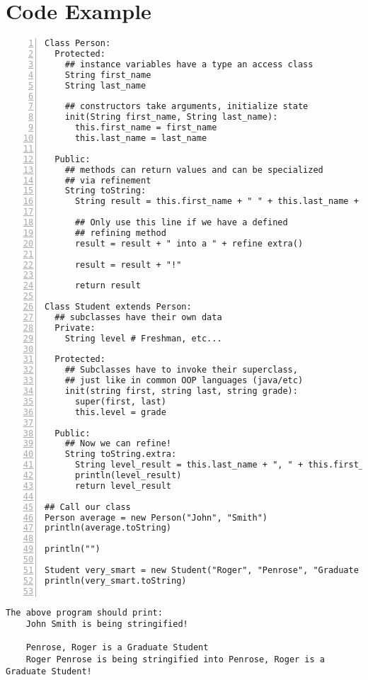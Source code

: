 \documentclass[10pt]{article}
\begin{document}
\section*{Code Example}

\begin{lstlisting}[numbers=left,label=Personhood,caption=Personhood]
Class Person:
  Protected:
    ## instance variables have a type an access class
    String first_name
    String last_name

    ## constructors take arguments, initialize state
    init(String first_name, String last_name):
      this.first_name = first_name
      this.last_name = last_name

  Public:
    ## methods can return values and can be specialized
    ## via refinement
    String toString:
      String result = this.first_name + " " + this.last_name + " is being stringified"
      
      ## Only use this line if we have a defined
      ## refining method
      result = result + " into a " + refine extra()
      
      result = result + "!"
      
      return result

Class Student extends Person:
  ## subclasses have their own data
  Private:
    String level # Freshman, etc...

  Protected:
    ## Subclasses have to invoke their superclass,
    ## just like in common OOP languages (java/etc)
    init(string first, string last, string grade):
      super(first, last)
      this.level = grade

  Public:
    ## Now we can refine!
    String toString.extra:
      String level_result = this.last_name + ", " + this.first_name + " is a " + this.level
      println(level_result)
      return level_result

## Call our class
Person average = new Person("John", "Smith")
println(average.toString)

println("")

Student very_smart = new Student("Roger", "Penrose", "Graduate Student")
println(very_smart.toString)
  
\end{lstlisting}

\begin{verbatim}
The above program should print:
    John Smith is being stringified!

    Penrose, Roger is a Graduate Student
    Roger Penrose is being stringified into Penrose, Roger is a Graduate Student!
\end{verbatim}
\end{document}
